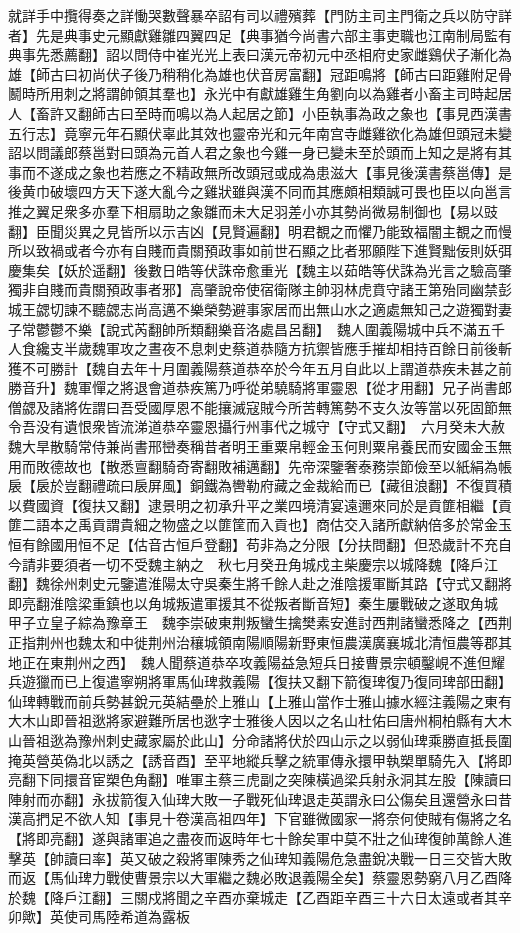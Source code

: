就詳手中攬得奏之詳慟哭數聲暴卒詔有司以禮殯葬【門防主司主門衛之兵以防守詳者】先是典事史元顯獻雞雛四翼四足【典事猶今尚書六部主事吏職也江南制局監有典事先悉薦翻】詔以問侍中崔光光上表曰漢元帝初元中丞相府史家雌鷄伏子漸化為雄【師古曰初尚伏子後乃稍稍化為雄也伏音房富翻】冠距鳴將【師古曰距雞附足骨鬭時所用刺之將謂帥領其羣也】永光中有獻雄雞生角劉向以為雞者小畜主司時起居人【畜許又翻師古曰至時而鳴以為人起居之節】小臣執事為政之象也【事見西漢書五行志】竟寧元年石顯伏辜此其效也靈帝光和元年南宫寺雌雞欲化為雄但頭冠未變詔以問議郎蔡邕對曰頭為元首人君之象也今雞一身已變未至於頭而上知之是將有其事而不遂成之象也若應之不精政無所改頭冠或成為患滋大【事見後漢書蔡邕傳】是後黄巾破壞四方天下遂大亂今之雞狀雖與漢不同而其應頗相類誠可畏也臣以向邕言推之翼足衆多亦羣下相扇助之象雛而未大足羽差小亦其勢尚微易制御也【易以豉翻】臣聞災異之見皆所以示吉凶【見賢遍翻】明君覩之而懼乃能致福闇主覩之而慢所以致禍或者今亦有自賤而貴關預政事如前世石顯之比者邪願陛下進賢黜佞則妖弭慶集矣【妖於遥翻】後數日皓等伏誅帝愈重光【魏主以茹皓等伏誅為光言之驗高肇獨非自賤而貴關預政事者邪】高肇說帝使宿衛隊主帥羽林虎賁守諸王第殆同幽禁彭城王勰切諫不聽勰志尚高邁不樂榮勢避事家居而出無山水之適處無知己之遊獨對妻子常鬱鬱不樂【說式芮翻帥所類翻樂音洛處昌呂翻】　魏人圍義陽城中兵不滿五千人食纔支半歲魏軍攻之晝夜不息刺史蔡道恭隨方抗禦皆應手摧却相持百餘日前後斬獲不可勝計【魏自去年十月圍義陽蔡道恭卒於今年五月自此以上謂道恭疾未甚之前勝音升】魏軍憚之將退會道恭疾篤乃呼從弟驍騎將軍靈恩【從才用翻】兄子尚書郎僧勰及諸將佐謂曰吾受國厚恩不能攘滅寇賊今所苦轉篤勢不支久汝等當以死固節無令吾没有遺恨衆皆流涕道恭卒靈恩攝行州事代之城守【守式又翻】　六月癸未大赦　魏大旱散騎常侍兼尚書邢巒奏稱昔者明王重粟帛輕金玉何則粟帛養民而安國金玉無用而敗德故也【散悉亶翻騎奇寄翻敗補邁翻】先帝深鑒奢泰務崇節儉至以紙絹為帳扆【扆於豈翻禮疏曰扆屏風】銅鐵為轡勒府藏之金裁給而已【藏徂浪翻】不復買積以費國資【復扶又翻】逮景明之初承升平之業四境清宴遠邇來同於是貢篚相繼【貢篚二語本之禹貢謂貴細之物盛之以篚筐而入貢也】商估交入諸所獻納倍多於常金玉恒有餘國用恒不足【估音古恒戶登翻】苟非為之分限【分扶問翻】但恐歲計不充自今請非要須者一切不受魏主納之　秋七月癸丑角城戍主柴慶宗以城降魏【降戶江翻】魏徐州刺史元鑒遣淮陽太守吳秦生將千餘人赴之淮陰援軍斷其路【守式又翻將即亮翻淮陰梁重鎮也以角城叛遣軍援其不從叛者斷音短】秦生屢戰破之遂取角城　甲子立皇子綜為豫章王　魏李崇破東荆叛蠻生擒樊素安進討西荆諸蠻悉降之【西荆正指荆州也魏太和中徙荆州治穰城領南陽順陽新野東恒農漢廣襄城北清恒農等郡其地正在東荆州之西】　魏人聞蔡道恭卒攻義陽益急短兵日接曹景宗頓鑿峴不進但耀兵遊獵而已上復遣寧朔將軍馬仙琕救義陽【復扶又翻下箭復琕復乃復同琕部田翻】仙琕轉戰而前兵勢甚銳元英結壘於上雅山【上雅山當作士雅山據水經注義陽之東有大木山即晉祖逖將家避難所居也逖字士雅後人因以之名山杜佑曰唐州桐柏縣有大木山晉祖逖為豫州刺史藏家屬於此山】分命諸將伏於四山示之以弱仙琕乘勝直抵長圍掩英營英偽北以誘之【誘音酉】至平地縱兵擊之統軍傳永擐甲執槊單騎先入【將即亮翻下同擐音宦槊色角翻】唯軍主蔡三虎副之突陳橫過梁兵射永洞其左股【陳讀曰陣射而亦翻】永拔箭復入仙琕大敗一子戰死仙琕退走英謂永曰公傷矣且還營永曰昔漢高捫足不欲人知【事見十卷漢高祖四年】下官雖微國家一將奈何使賊有傷將之名【將即亮翻】遂與諸軍追之盡夜而返時年七十餘矣軍中莫不壯之仙琕復帥萬餘人進擊英【帥讀曰率】英又破之殺將軍陳秀之仙琕知義陽危急盡銳决戰一日三交皆大敗而返【馬仙琕力戰使曹景宗以大軍繼之魏必敗退義陽全矣】蔡靈恩勢窮八月乙酉降於魏【降戶江翻】三關戍將聞之辛酉亦棄城走【乙酉距辛酉三十六日太遠或者其辛卯歟】英使司馬陸希道為露板